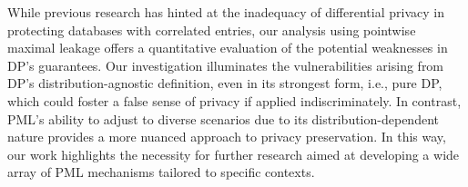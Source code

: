 While previous research has hinted at the inadequacy of differential privacy in protecting databases with correlated entries, our analysis using pointwise maximal leakage offers a quantitative evaluation of the potential weaknesses in DP's guarantees. Our investigation illuminates the vulnerabilities arising from DP's distribution-agnostic definition, even in its strongest form, i.e., pure DP, which could foster a false sense of privacy if applied indiscriminately. In contrast, PML's ability to adjust to diverse scenarios due to its distribution-dependent nature provides a more nuanced approach to privacy preservation. In this way, our work highlights the necessity for further research aimed at developing a wide array of PML mechanisms tailored to specific contexts.




